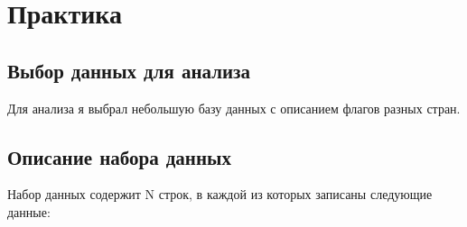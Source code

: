 \chapter{Практика}

\section{Выбор данных для анализа}

Для анализа я выбрал небольшую базу данных с описанием флагов разных стран.

\section{Описание набора данных}
Набор данных содержит N строк, в каждой из которых записаны следующие данные:

